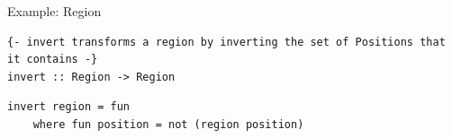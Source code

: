 \documentclass[8pt,aspectratio=169]{beamer}
\begin{document}
\begin{frame}[fragile]{Example: Region}
\vspace{3mm}

\setlength\partopsep{-\topsep}
\addtolength\partopsep{-\parskip}
\addtolength\partopsep{0.1cm}

\pause
\begin{verbatim}
{- invert transforms a region by inverting the set of Positions that it contains -}
invert :: Region -> Region
\end{verbatim}

\pause
\begin{verbatim}
invert region = fun
    where fun position = not (region position)
\end{verbatim}

\setlength\partopsep{2pt}

\end{frame}

\end{document}
